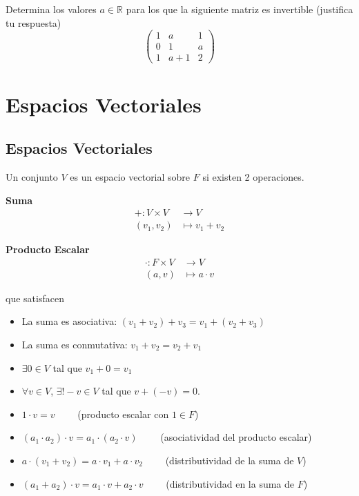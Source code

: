 \documentclass[12pt,a4paper]{book}
\begin{document}
    \begin{ejercicio}
        Determina los valores $a\in\mathbb{R}$ para los que la siguiente
        matriz es invertible (justifica tu respuesta)
        \begin{equation*}
            \begin{pmatrix}
                1 & a & 1\\
                0 & 1 & a\\
                1 & a+1 & 2
            \end{pmatrix}
        \end{equation*}
    \end{ejercicio}

    \chapter{Espacios Vectoriales}

    \section{Espacios Vectoriales}

    Un conjunto $V$ es un espacio vectorial sobre $F$ si existen 2 operaciones.

    \textbf{Suma}
    \begin{align*}
        +:V\times V&\to V\\
        (v_{1},v_{2})&\mapsto v_{1}+v_{2}
    \end{align*}

    \textbf{Producto Escalar}
    \begin{align*}
        \cdot: F\times V&\to V\\
        (a,v)&\mapsto a\cdot v
    \end{align*}

    que satisfacen
    \begin{itemize}
        \item La suma es asociativa: $(v_{1}+v_{2})+v_{3}=v_{1}+(v_{2}+v_{3})$
        \item La suma es conmutativa: $v_{1}+v_{2}=v_{2}+v_{1}$
        \item $\exists0\in V$ tal que $v_{1}+0=v_{1}$
        \item $\forall v\in V$, $\exists! -v\in V$ tal que $v+(-v)=0$.
        \item $1\cdot v=v\qquad$ (producto escalar con $1\in F$)
        \item $(a_{1}\cdot a_{2})\cdot v=a_{1}\cdot(a_{2}\cdot v)\qquad$ (asociatividad del producto escalar)
        \item $a\cdot(v_{1}+v_{2})=a\cdot v_{1}+a\cdot v_{2}\qquad$ (distributividad de la suma de $V$)
        \item $(a_{1}+a_{2})\cdot v=a_{1}\cdot v+a_{2}\cdot v\qquad$ (distributividad en la suma de $F$)  
    \end{itemize}
\end{document}
